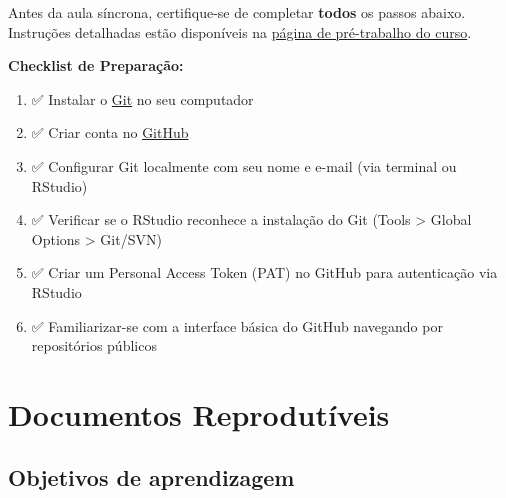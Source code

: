 \documentclass[
  a4paper,
]{book}
\providecommand{\tightlist}{%
  \setlength{\itemsep}{0pt}\setlength{\parskip}{0pt}}\usepackage{longtable,booktabs,array}
\newcommand{\emojitext}[1]{{\emoji #1}}
\begin{document}
\begin{tcolorbox}[enhanced jigsaw, colback=white, toptitle=1mm, opacityback=0, left=2mm, rightrule=.15mm, title=\textcolor{quarto-callout-important-color}{\faExclamation}\hspace{0.5em}{Pré-requisitos}, coltitle=black, opacitybacktitle=0.6, breakable, toprule=.15mm, bottomtitle=1mm, titlerule=0mm, bottomrule=.15mm, arc=.35mm, leftrule=.75mm, colframe=quarto-callout-important-color-frame, colbacktitle=quarto-callout-important-color!10!white]

Antes da aula síncrona, certifique-se de completar \textbf{todos} os
passos abaixo. Instruções detalhadas estão disponíveis na
\href{https://phdpablo.github.io/curso-open-science/00-prework.html}{página
de pré-trabalho do curso}.

\vspace{10pt}

\textbf{Checklist de Preparação:}

\vspace{10pt}

\begin{enumerate}
\def\labelenumi{\arabic{enumi}.}
\tightlist
\item
  \emojitext{✅} Instalar o \href{https://git-scm.com/downloads}{Git} no
  seu computador
\item
  \emojitext{✅} Criar conta no \href{https://github.com/signup}{GitHub}
\item
  \emojitext{✅} Configurar Git localmente com seu nome e e-mail (via
  terminal ou RStudio)
\item
  \emojitext{✅} Verificar se o RStudio reconhece a instalação do Git
  (Tools \textgreater{} Global Options \textgreater{} Git/SVN)
\item
  \emojitext{✅} Criar um Personal Access Token (PAT) no GitHub para
  autenticação via RStudio
\item
  \emojitext{✅} Familiarizar-se com a interface básica do GitHub
  navegando por repositórios públicos
\end{enumerate}

\end{tcolorbox}


\chapter{Documentos Reprodutíveis}\label{sec-quarto}

\section{Objetivos de aprendizagem}\label{objetivos-de-aprendizagem-5}
\end{document}
